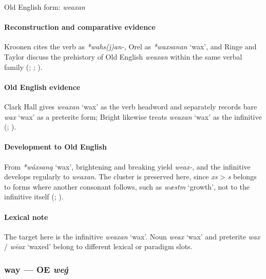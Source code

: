 \documentclass[
  british,
  a4paper,
]{article}
\providecommand{\Recon}[1]{\emph{*#1}}
\begin{document}
Old English form: \emph{weaxan}

\paragraph{Reconstruction and comparative
evidence}\label{reconstruction-and-comparative-evidence-67}

Kroonen cites the verb as \emph{*wahs(j)an-}, Orel as \Recon{waxsanan}
`wax', and Ringe and Taylor discuss the prehistory of Old English
\emph{weaxan} within the same verbal family
(; ; ).

\paragraph{Old English evidence}\label{old-english-evidence-67}

Clark Hall gives \emph{weaxan} `wax' as the verb headword and separately
records bare \emph{wax} `wax' as a preterite form; Bright likewise
treats \emph{weaxan} `wax' as the infinitive
(;
).

\paragraph{Development to Old
English}\label{development-to-old-english-67}

From \Recon{wáxsaną} `wax', brightening and breaking yield \emph{weax-},
and the infinitive develops regularly to \emph{weaxan}. The cluster is
preserved here, since \emph{xs} \textgreater{} \emph{s} belongs to forms
where another consonant follows, such as \emph{wæstm} `growth', not to
the infinitive itself (;
).

\paragraph{Lexical note}\label{lexical-note-3}

The target here is the infinitive \emph{weaxan} `wax'. Noun \emph{weax}
`wax' and preterite \emph{wax} / \emph{wēox} `waxed' belong to different
lexical or paradigm slots.

\subsubsection{\texorpdfstring{way --- OE
\emph{weġ}}{way --- OE weġ}}\label{way-oe-weux121}
\end{document}
